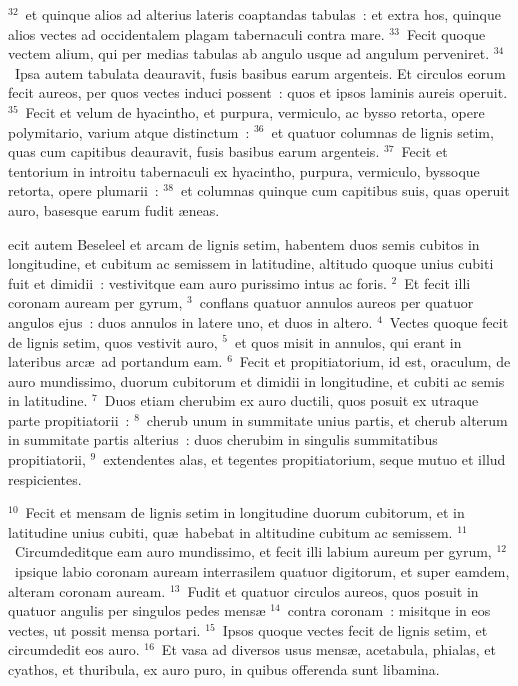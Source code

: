${}^{32}$~et quinque alios ad alterius lateris coaptandas tabulas~: et extra hos, quinque alios vectes ad occidentalem plagam tabernaculi contra mare.
${}^{33}$~Fecit quoque vectem alium, qui per medias tabulas ab angulo usque ad angulum perveniret.
${}^{34}$~Ipsa autem tabulata deauravit, fusis basibus earum argenteis. Et circulos eorum fecit aureos, per quos vectes induci possent~: quos et ipsos laminis aureis operuit.
${}^{35}$~Fecit et velum de hyacintho, et purpura, vermiculo, ac bysso retorta, opere polymitario, varium atque distinctum~:
${}^{36}$~et quatuor columnas de lignis setim, quas cum capitibus deauravit, fusis basibus earum argenteis.
${}^{37}$~Fecit et tentorium in introitu tabernaculi ex hyacintho, purpura, vermiculo, byssoque retorta, opere plumarii~:
${}^{38}$~et columnas quinque cum capitibus suis, quas operuit auro, basesque earum fudit \ae neas.

\bchapter
{}ecit autem Beseleel et arcam de lignis setim, habentem duos semis cubitos in longitudine, et cubitum ac semissem in latitudine, altitudo quoque unius cubiti fuit et dimidii~: vestivitque eam auro purissimo intus ac foris.
${}^{2}$~Et fecit illi coronam auream per gyrum,
${}^{3}$~conflans quatuor annulos aureos per quatuor angulos ejus~: duos annulos in latere uno, et duos in altero.
${}^{4}$~Vectes quoque fecit de lignis setim, quos vestivit auro,
${}^{5}$~et quos misit in annulos, qui erant in lateribus arc\ae\ ad portandum eam.
${}^{6}$~Fecit et propitiatorium, id est, oraculum, de auro mundissimo, duorum cubitorum et dimidii in longitudine, et cubiti ac semis in latitudine.
${}^{7}$~Duos etiam cherubim ex auro ductili, quos posuit ex utraque parte propitiatorii~:
${}^{8}$~cherub unum in summitate unius partis, et cherub alterum in summitate partis alterius~: duos cherubim in singulis summitatibus propitiatorii,
${}^{9}$~extendentes alas, et tegentes propitiatorium, seque mutuo et illud respicientes.


${}^{10}$~Fecit et mensam de lignis setim in longitudine duorum cubitorum, et in latitudine unius cubiti, qu\ae\ habebat in altitudine cubitum ac semissem.
${}^{11}$~Circumdeditque eam auro mundissimo, et fecit illi labium aureum per gyrum,
${}^{12}$~ipsique labio coronam auream interrasilem quatuor digitorum, et super eamdem, alteram coronam auream.
${}^{13}$~Fudit et quatuor circulos aureos, quos posuit in quatuor angulis per singulos pedes mens\ae 
${}^{14}$~contra coronam~: misitque in eos vectes, ut possit mensa portari.
${}^{15}$~Ipsos quoque vectes fecit de lignis setim, et circumdedit eos auro.
${}^{16}$~Et vasa ad diversos usus mens\ae , acetabula, phialas, et cyathos, et thuribula, ex auro puro, in quibus offerenda sunt libamina.


